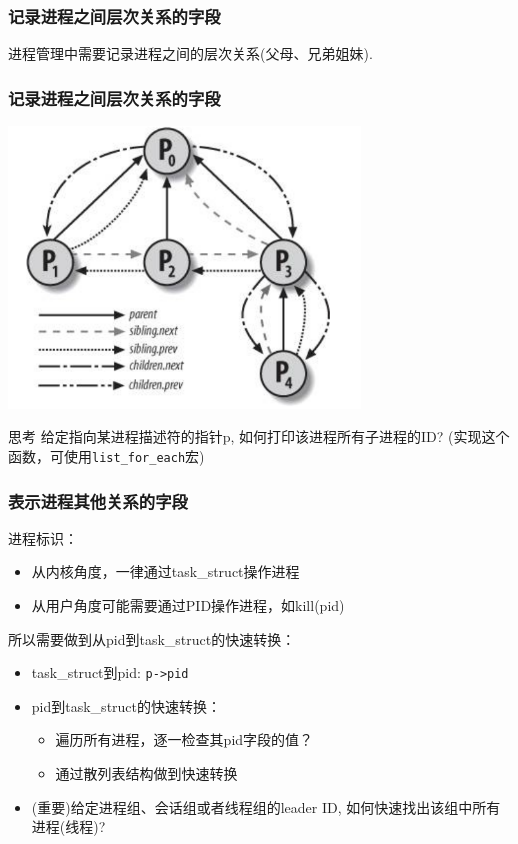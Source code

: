 \documentclass[xcolor=svgnames]{beamer}
\begin{document}
\begin{CJK*}{UTF8}{gbsn}
\begin{frame}[fragile]
\frametitle{记录进程之间层次关系的字段}
进程管理中需要记录进程之间的层次关系(父母、兄弟姐妹).

\lstparents
\end{frame}

\begin{frame}[fragile]
\frametitle{记录进程之间层次关系的字段}
\includegraphics[width=0.7\textwidth]{parent2.png}
\begin{block}{思考}
给定指向某进程描述符的指针p, 如何打印该进程所有子进程的ID? (实现这个函数，可使用\verb|list_for_each|宏)
\end{block}
\end{frame}

\begin{frame}[fragile]
\frametitle{表示进程其他关系的字段}
进程标识：

\begin{itemize}
\item 从内核角度，一律通过task\_struct操作进程
\item 从用户角度可能需要通过PID操作进程，如kill(pid)
\end{itemize}

所以需要做到从pid到task\_struct的快速转换：

\begin{itemize}
\item task\_struct到pid: \verb|p->pid|
\item pid到task\_struct的快速转换：
\begin{itemize}
\item 遍历所有进程，逐一检查其pid字段的值？
\item 通过散列表结构做到快速转换
\end{itemize}
\item (重要)给定进程组、会话组或者线程组的leader ID, 如何快速找出该组中所有进程(线程)?
\end{itemize}


\end{frame}
\end{CJK*}
\end{document}
